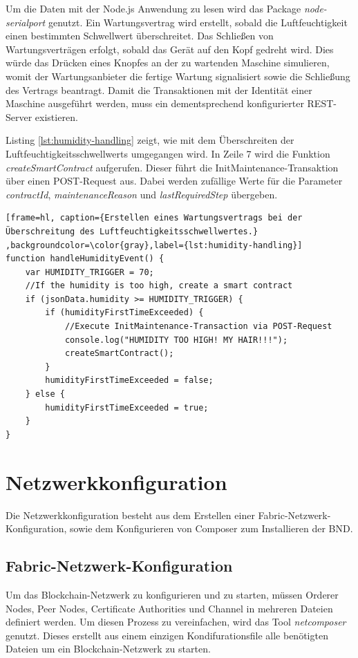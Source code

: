 Um die Daten mit der Node.js Anwendung zu lesen wird das Package \textit{node-serialport} \cite{NodeSerialportTeamnodeserialportGithubRepository2018} genutzt. Ein Wartungsvertrag wird erstellt, sobald die Luftfeuchtigkeit einen bestimmten Schwellwert überschreitet. Das Schließen von Wartungsverträgen erfolgt, sobald das Gerät auf den Kopf gedreht wird. Dies würde das Drücken eines Knopfes an der zu wartenden Maschine simulieren, womit der Wartungsanbieter die fertige Wartung signalisiert sowie die Schließung des Vertrags beantragt. Damit die Transaktionen mit der Identität einer Maschine ausgeführt werden, muss ein dementsprechend konfigurierter REST-Server existieren. 

Listing \ref{lst:humidity-handling} zeigt, wie mit dem Überschreiten der Luftfeuchtigkeitsschwellwerts umgegangen wird. In Zeile 7 wird die Funktion \textit{createSmartContract} aufgerufen. Dieser führt die InitMaintenance-Transaktion über einen POST-Request aus. Dabei werden zufällige Werte für die Parameter \textit{contractId}, \textit{maintenanceReason} und \textit{lastRequiredStep} übergeben.

\begin{lstfloat}
\begin{lstlisting}[frame=hl, caption={Erstellen eines Wartungsvertrags bei der Überschreitung des Luftfeuchtigkeitsschwellwertes.} ,backgroundcolor=\color{gray},label={lst:humidity-handling}]
function handleHumidityEvent() {
    var HUMIDITY_TRIGGER = 70;
    //If the humidity is too high, create a smart contract
    if (jsonData.humidity >= HUMIDITY_TRIGGER) {
        if (humidityFirstTimeExceeded) {
            //Execute InitMaintenance-Transaction via POST-Request
            console.log("HUMIDITY TOO HIGH! MY HAIR!!!");
            createSmartContract(); 
        }
        humidityFirstTimeExceeded = false;
    } else {
        humidityFirstTimeExceeded = true;
    }
}
\end{lstlisting} 
\end{lstfloat}

\section{Netzwerkkonfiguration}
\label{sec:network-config}
Die Netzwerkkonfiguration besteht aus dem Erstellen einer Fabric-Netzwerk-Konfiguration, sowie dem Konfigurieren von Composer zum Installieren der \acs{BND}. 

\subsection{Fabric-Netzwerk-Konfiguration}
Um das Blockchain-Netzwerk zu konfigurieren und zu starten, müssen Orderer Nodes, Peer Nodes, Certificate Authorities und Channel in mehreren Dateien definiert werden. Um diesen Prozess zu vereinfachen, wird das Tool \textit{netcomposer} \cite{IBMSilvergateTeamnetcomposerGithubRepository2018} genutzt. Dieses erstellt aus einem einzigen Kondifurationsfile alle benötigten Dateien um ein Blockchain-Netzwerk zu starten. 

